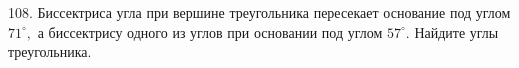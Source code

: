 108. Биссектриса угла при вершине треугольника пересекает основание под углом $71^\circ,$ а биссектрису одного из углов при основании под углом $57^\circ.$ Найдите углы треугольника.\\
